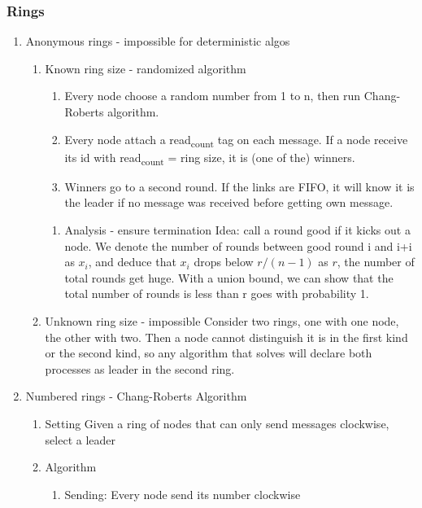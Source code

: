 \documentclass[11pt]{article}
\begin{document}
\subsubsection{Rings}
\label{sec:org77d9dab}
\begin{enumerate}
\item Anonymous rings - impossible for deterministic algos
\label{sec:org7b34435}
\begin{enumerate}
\item Known ring size - randomized algorithm
\label{sec:orgc3c27d9}
\begin{enumerate}
\item Every node choose a random number from 1 to n, then run Chang-Roberts
algorithm.
\item Every node attach a read\textsubscript{count} tag on each message. If a node receive its id
with read\textsubscript{count} = ring size, it is (one of the) winners.
\item Winners go to a second round. If the links are FIFO, it will know it is the
leader if no message was received before getting own message.
\end{enumerate}
\begin{enumerate}
\item Analysis - ensure termination
\label{sec:orgef44ac4}
Idea: call a round good if it kicks out a node. We denote the number of rounds
between good round i and i+i as \(x_i\), and deduce that \(x_i\) drops below
\(r/(n-1)\) as \(r\), the number of total rounds get huge. With a union bound, we
can show that the total number of rounds is less than r goes with probability 1.
\end{enumerate}
\item Unknown ring size - impossible
\label{sec:org7680e59}
Consider two rings, one with one node, the other with two. Then a node cannot
distinguish it is in the first kind or the second kind, so any algorithm that
solves will declare both processes as leader in the second ring.
\end{enumerate}
\item Numbered rings - Chang-Roberts Algorithm
\label{sec:org1069f33}
\begin{enumerate}
\item Setting
\label{sec:org62e9c00}
Given a ring of nodes that can only send messages clockwise, select a leader
\item Algorithm
\label{sec:org499bebf}
\begin{enumerate}
\item Sending: Every node send its number clockwise

\end{enumerate}
\end{enumerate}
\end{enumerate}
\end{document}
